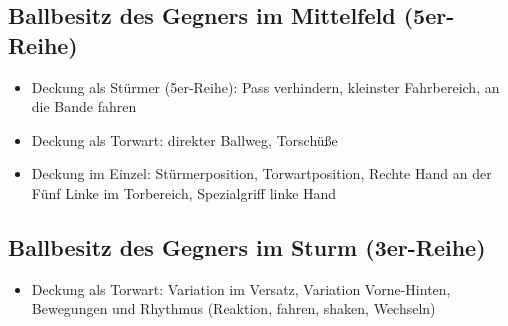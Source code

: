 \subsection{Ballbesitz des Gegners im Mittelfeld (5er-Reihe)}
\label{technik:defensive:gegnermittelfeld}

\begin{itemize}
\item Deckung als Stürmer (5er-Reihe): Pass verhindern, kleinster Fahrbereich, an die Bande fahren
\item Deckung als Torwart: direkter Ballweg, Torschüße
\item Deckung im Einzel: Stürmerposition, Torwartposition, Rechte Hand an der Fünf Linke im Torbereich, Spezialgriff linke Hand 
\end{itemize}


\subsection{Ballbesitz des Gegners im Sturm (3er-Reihe)}
\label{technik:defensive:gegnersturm}

\begin{itemize}
    \item Deckung als Torwart: Variation im Versatz, Variation Vorne-Hinten, Bewegungen und Rhythmus (Reaktion, fahren, shaken, Wechseln)
\end{itemize}

